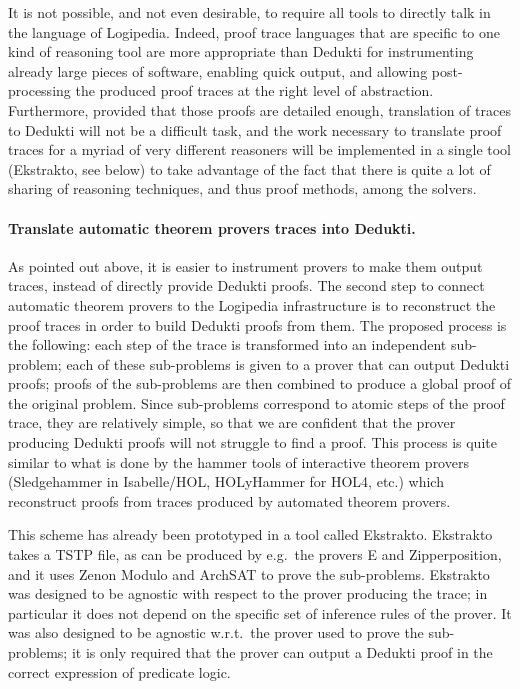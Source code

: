 It is not possible, and not even desirable, to require all tools to
directly talk in the language of Logipedia.  Indeed, proof trace
languages that are specific to one kind of reasoning tool are more
appropriate than Dedukti for instrumenting already large pieces of
software, enabling quick output, and allowing post-processing the
produced proof traces at the right level of abstraction.
Furthermore, provided that those proofs are detailed enough,
translation of traces to Dedukti will not be a difficult task, and
the work necessary to translate proof traces for a myriad of very
different reasoners will be implemented in a single tool (Ekstrakto,
see below) to take advantage of the fact that there is quite a lot of
sharing of reasoning techniques, and thus proof methods, among the
solvers.

\paragraph*{Translate automatic theorem provers traces into Dedukti.}
As pointed out above, it is easier to instrument provers to make them
output traces, instead of directly provide Dedukti proofs. The second
step to connect automatic theorem provers to the Logipedia
infrastructure is to reconstruct the proof traces in order to build
Dedukti proofs from them. The proposed process is the following: each
step of the trace is transformed into an independent sub-problem; each
of these sub-problems is given to a prover that can output Dedukti
proofs; proofs of the sub-problems are then combined to produce a
global proof of the original problem.  Since sub-problems correspond
to atomic steps of the proof trace, they are relatively simple, so
that we are confident that the prover producing Dedukti proofs will
not struggle to find a proof. This process is quite similar to what is
done by the hammer tools of interactive theorem provers (Sledgehammer
in Isabelle/HOL, HOLyHammer for HOL4, etc.) which reconstruct proofs
from traces produced by automated theorem provers.

This scheme has already been prototyped in a tool called
Ekstrakto. Ekstrakto takes a TSTP file, as can be produced by
e.g.\ the provers E and Zipperposition, and it uses Zenon Modulo and
ArchSAT to prove the sub-problems. Ekstrakto was designed to be
agnostic with respect to the prover producing the trace; in particular
it does not depend on the specific set of inference rules of the
prover. It was also designed to be agnostic w.r.t.\ the prover used to
prove the sub-problems; it is only required that the prover can output
a Dedukti proof in the correct expression of predicate logic.

